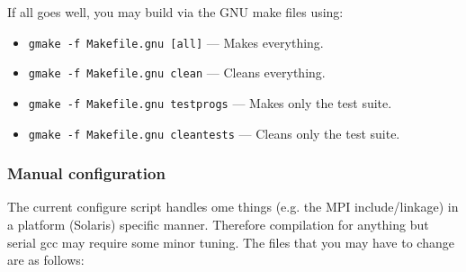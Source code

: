 \documentclass[12pt]{article}
\begin{document}
If all goes well, you may build via the GNU make files using:
\begin{itemize}
 \item{\tt gmake -f Makefile.gnu [all]} --- Makes everything.
 \item{\tt gmake -f Makefile.gnu clean} --- Cleans everything.
 \item{\tt gmake -f Makefile.gnu testprogs} --- Makes only the test suite.
 \item{\tt gmake -f Makefile.gnu cleantests} --- Cleans only the test suite.
\end{itemize}

\subsubsection{Manual configuration}
The current configure script handles ome things (e.g. the MPI include/linkage)
in a platform (Solaris) specific manner.  Therefore compilation for anything but serial gcc
may require some minor tuning.  The files that you may have to change are as
follows:
\end{document}
